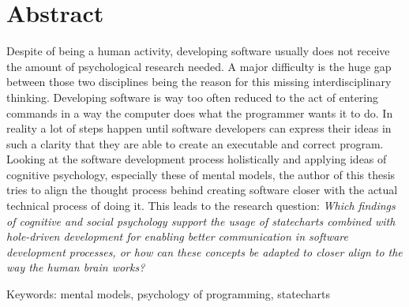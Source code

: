\chapter{Abstract}
\noindent
Despite of being a human activity, developing software usually does not receive the amount of psychological research needed.
A major difficulty is the huge gap between those two disciplines being the reason for this missing interdisciplinary thinking.
Developing software is way too often reduced to the act of entering commands in a way the computer does what the programmer wants it to do.
In reality a lot of steps happen until software developers can express their ideas in such a clarity that they are able to create an executable and correct program.
Looking at the software development process holistically and applying ideas of cognitive psychology, especially these of mental models, the author of this thesis tries to align the thought process behind creating software closer with the actual technical process of doing it.
This leads to the research question: \emph{Which findings of cognitive and social psychology support the usage of statecharts combined with hole-driven development for enabling better communication in software development processes, or how can these concepts be adapted to closer align to the way the human brain works?}

\vspace{2cm}
\noindent
Keywords: mental models, psychology of programming, statecharts